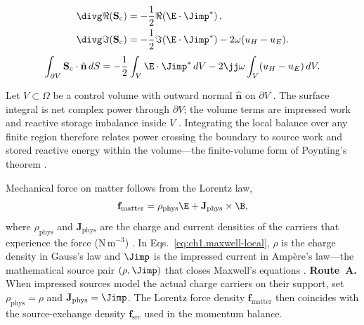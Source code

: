 \begin{equation}
\label{eq:ch1.poynting-real-imag-split}
\begin{aligned}
\divg\Re(\mathbf{S}_\mathrm{c})&=-\frac12\Re\!\left(\E\cdot\Jimp^*\right),\\
\divg\Im(\mathbf{S}_\mathrm{c})&=-\frac12\Im\!\left(\E\cdot\Jimp^*\right)-2\omega(u_H-u_E).
\end{aligned}
\end{equation}
\begin{equation}
\label{eq:ch1.dual-invariant-energy}\int_{\partial V}\mathbf{S}_\mathrm{c}\cdot\hat{\mathbf{n}}\,dS
=-\frac12\int_V\E\cdot\Jimp^*\,dV
-2\jj\omega\int_V(u_H-u_E)\,dV.
\end{equation}
\addtocounter{equation}{-1}\label{eq:ch1.power-balance-integral}%
Let $V\subset\Omega$ be a control volume with outward normal $\hat{\mathbf{n}}$ on $\partial V$ \cite{stratton1941}. The surface integral is net complex power through $\partial V$; the volume terms are impressed work and reactive storage imbalance inside $V$ \cite{poynting1884}. Integrating the local balance over any finite region therefore relates power crossing the boundary to source work and stored reactive energy within the volume---the finite-volume form of Poynting's theorem \cite{stratton1941}.

Mechanical force on matter follows from the Lorentz law,
\begin{equation}
\label{eq:ch1.lorentz-force}
\mathbf{f}_{\mathrm{matter}}=\rho_{\mathrm{phys}}\E+\mathbf{J}_{\mathrm{phys}}\times\B,
\end{equation}
where $\rho_{\mathrm{phys}}$ and $\mathbf{J}_{\mathrm{phys}}$ are the charge and current densities of the carriers that experience the force (N\,m$^{-3}$) \cite{maxwell1873,stratton1941}.
In Eqs.~\eqref{eq:ch1.maxwell-local}, $\rho$ is the charge density in Gauss's law and $\Jimp$ is the impressed current in Amp\`ere's law---the mathematical source pair $(\rho,\Jimp)$ that closes Maxwell's equations \cite{maxwell1873,stratton1941}.
\textbf{Route~A.} When impressed sources model the actual charge carriers on their support, set $\rho_{\mathrm{phys}}=\rho$ and $\mathbf{J}_{\mathrm{phys}}=\Jimp$. The Lorentz force density $\mathbf{f}_{\mathrm{matter}}$ then coincides with the source-exchange density $\mathbf{f}_{\mathrm{src}}$ used in the momentum balance.

